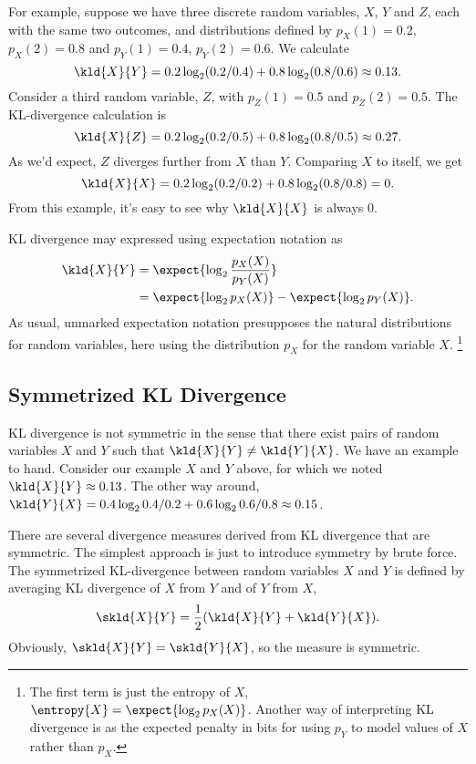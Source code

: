 For example, suppose we have three discrete random variables, $X$, $Y$
and $Z$, each with the same two outcomes, and distributions defined by
$p_X(1) = 0.2$, $p_X(2) = 0.8$ and $p_Y(1) = 0.4$, $p_Y(2) = 0.6$.  We
calculate 
%
\[
\kld{X}{Y} = 0.2 \log_2 (0.2/0.4) + 0.8 \log_2 (0.8/0.6) \approx 0.13.
\]
%
Consider a third random variable, $Z$, with $p_Z(1) = 0.5$ and
$p_Z(2) = 0.5$.  The KL-divergence calculation is 
%
\[
\kld{X}{Z} = 0.2 \log_2 (0.2/0.5) + 0.8 \log_2 (0.8/0.5) \approx 0.27.
\]
As we'd expect, $Z$ diverges further from $X$ than $Y$.  
Comparing $X$ to itself, we get
%
\[
\kld{X}{X} = 0.2 \log_2 (0.2/0.2) + 0.8 \log_2(0.8/0.8) = 0.
\]  
%
From this example, it's easy to see why $\kld{X}{X}$ is always 0.

KL divergence may expressed using expectation notation as
%
\begin{align}
\kld{X}{Y} 
&= \expect{\log_2 \frac{p_X(X)}{p_Y(X)}}
\\
&= \expect{\log_2 p_X(X)} - \expect{\log_2 p_Y(X)}.
\end{align}
%
As usual, unmarked expectation notation presupposes the natural
distributions for random variables, here using the distribution $p_X$
for the random variable $X$.%
%
\footnote{The first term is just the entropy of $X$,
$\entropy{X} = \expect{\log_2 p_X(X)}$.  Another way of interpreting
KL divergence is as the expected penalty in bits for using $p_Y$ to
model values of $X$ rather than $p_X$.}

\subsection{Symmetrized KL Divergence}

KL divergence is not symmetric in the sense that there exist pairs of
random variables $X$ and $Y$ such that $\kld{X}{Y} \neq \kld{Y}{X}$.
We have an example to hand.  Consider our example $X$ and $Y$ above,
for which we noted $\kld{X}{Y} \approx 0.13$.  The other way around,
$\kld{Y}{X} = 0.4 \log_2 0.4/0.2 + 0.6 \log_2 0.6/0.8 \approx 0.15$.

There are several divergence measures derived from KL divergence that
are symmetric.  The simplest approach is just to introduce symmetry
by brute force.  The symmetrized KL-divergence between random variables
$X$ and $Y$ is defined by averaging KL divergence of $X$ from $Y$
and of $Y$ from $X$,
%
\begin{equation}
\skld{X}{Y} = \frac{1}{2}(\kld{X}{Y} + \kld{Y}{X}).
\end{equation}
%
Obviously, $\skld{X}{Y} = \skld{Y}{X}$, so the measure is symmetric.


